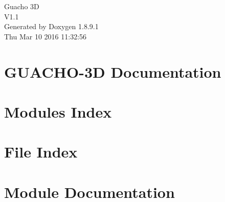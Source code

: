 \documentclass[twoside]{book}
\newcommand{\+}{\discretionary{\mbox{\scriptsize$\hookleftarrow$}}{}{}}
\newcommand{\clearemptydoublepage}{%
  \newpage{\pagestyle{empty}\cleardoublepage}%
}
\begin{document}
\hypersetup{pageanchor=false,
             bookmarks=true,
             bookmarksnumbered=true,
             pdfencoding=unicode
            }
\begin{titlepage}
\vspace*{7cm}
\begin{center}%
{\Large Guacho 3\+D \\[1ex]\large V1.\+1 }\\
\vspace*{1cm}
{\large Generated by Doxygen 1.8.9.1}\\
\vspace*{0.5cm}
{\small Thu Mar 10 2016 11:32:56}\\
\end{center}
\end{titlepage}
\clearemptydoublepage
\tableofcontents
\clearemptydoublepage
{}
\hypersetup{pageanchor=true}

\chapter{G\+U\+A\+C\+H\+O-\/3\+D Documentation}
\label{index}\hypertarget{index}{}
\chapter{Modules Index}

\chapter{File Index}

\chapter{Module Documentation}

























\end{document}
